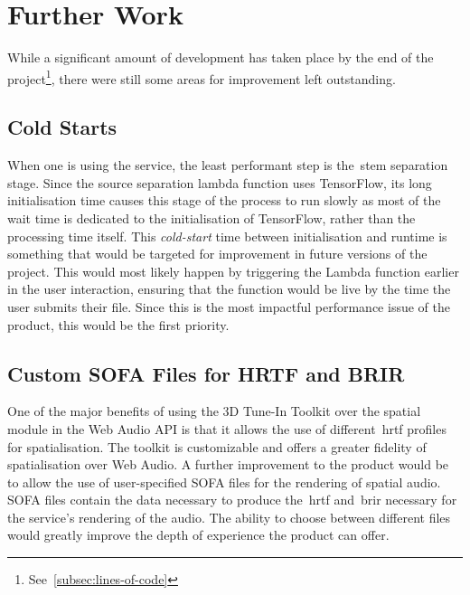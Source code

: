 \thispagestyle{plain}
\newpage
\section{Further Work}\label{sec:further-work}

\normalsize

While a significant amount of development has taken place by the end of the project\footnote{See~\ref{subsec:lines-of-code}},
there were still some areas for improvement left outstanding.

\subsection{Cold Starts}\label{subsec:cold-starts}

When one is using the service, the least performant step is the~\gls{stem} separation stage.
Since the source separation lambda function uses TensorFlow,
its long initialisation time causes this stage of the process
to run slowly as most of the wait time is dedicated to the initialisation of TensorFlow,
rather than the processing time itself.
This \textit{cold-start}
time between initialisation and runtime is something
that would be targeted for improvement in future versions of the project.
This would most likely happen
by triggering the Lambda function earlier in the user interaction,
ensuring that the function would be live by the time the user submits their file.
Since this is the most impactful performance issue of the product, this would be the first priority.

\subsection{Custom SOFA Files for HRTF and BRIR}\label{subsec:custom-hrtf-and-hrir-files}

One of the major benefits
of using the 3D Tune-In Toolkit over the spatial module in the Web Audio API is that it allows the use of different~\gls{hrtf} profiles for spatialisation.
The toolkit is customizable and offers a greater fidelity of spatialisation over Web Audio.
A further improvement to the product would be
to allow the use of user-specified SOFA files for the rendering of spatial audio.
SOFA files contain the data necessary to produce the~\gls{hrtf} and~\gls{brir} necessary for the service's rendering of the audio.
The ability to choose between different files would greatly improve the depth of experience the product can offer.

